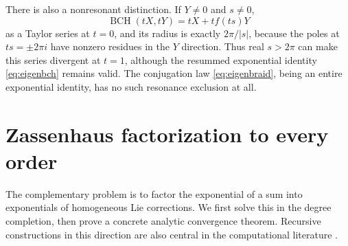 \documentclass[11pt]{article}
\numberwithin{equation}{section}
\theoremstyle{definition}
\theoremstyle{remark}
\DeclareMathOperator{\BCH}{BCH}
\begin{document}
There is also a nonresonant distinction. If $Y\ne0$ and $s\ne0$,
\begin{equation}\label{eq:eigenscaled}
 \BCH(tX,tY)=tX+t f(ts)Y
\end{equation}
as a Taylor series at $t=0$, and its radius is exactly
$2\pi/|s|$, because the poles at $ts=\pm2\pi i$ have nonzero
residues in the $Y$ direction. Thus real $s>2\pi$ can make this
series divergent at $t=1$, although the resummed exponential
identity \eqref{eq:eigenbch} remains valid. The conjugation law
\eqref{eq:eigenbraid}, being an entire exponential identity, has
no such resonance exclusion at all.

\section{Zassenhaus factorization to every order}
\label{sec:zassenhaus}
The complementary problem is to factor the exponential of a sum
into exponentials of homogeneous Lie corrections. We first solve
this in the degree completion, then prove a concrete analytic
convergence theorem. Recursive constructions in this direction are
also central in the computational literature \cite{casas}.
\end{document}
